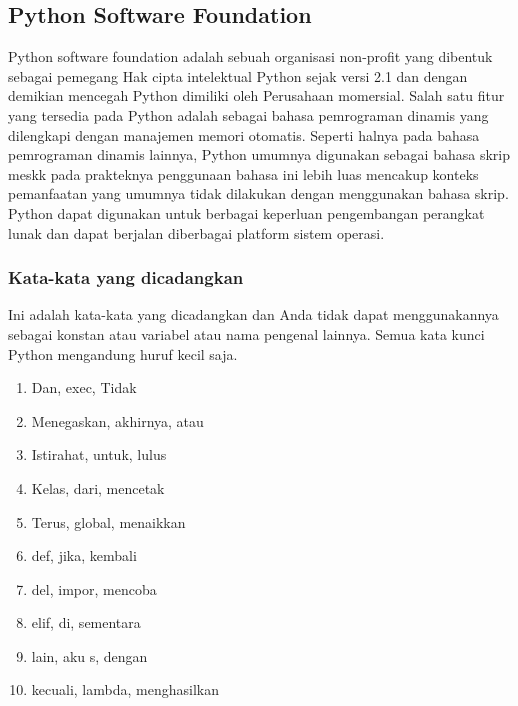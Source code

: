 \subsection{Python Software Foundation}
Python software foundation adalah sebuah organisasi non-profit yang dibentuk sebagai pemegang Hak cipta intelektual Python sejak versi 2.1 dan dengan demikian mencegah Python dimiliki oleh Perusahaan momersial. Salah satu fitur yang tersedia pada Python adalah sebagai bahasa pemrograman dinamis yang dilengkapi dengan manajemen memori otomatis. Seperti halnya pada bahasa pemrograman dinamis lainnya, Python umumnya digunakan sebagai bahasa skrip meskk pada prakteknya penggunaan bahasa ini lebih luas mencakup konteks pemanfaatan yang umumnya tidak dilakukan dengan menggunakan bahasa skrip. Python dapat digunakan untuk berbagai keperluan pengembangan perangkat lunak dan dapat berjalan diberbagai platform sistem operasi.

\subsubsection{Kata-kata yang dicadangkan}
Ini adalah kata-kata yang dicadangkan dan Anda tidak dapat menggunakannya sebagai konstan atau variabel 
atau nama pengenal lainnya. Semua kata kunci Python mengandung huruf kecil saja.
\begin{enumerate}
    \item Dan, exec, Tidak
    \item Menegaskan, akhirnya, atau
    \item Istirahat, untuk, lulus
    \item Kelas, dari, mencetak
    \item Terus, global, menaikkan
    \item def, jika, kembali
    \item del, impor, mencoba
    \item elif, di, sementara
    \item lain, aku s, dengan
    \item kecuali, lambda, menghasilkan
\end{enumerate}

